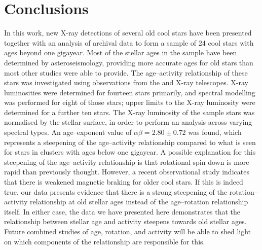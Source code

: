 \section{Conclusions}
In this work, new X-ray detections of several old cool stars have been presented together with an analysis of archival data to form a sample of 24 cool stars with ages beyond one gigayear. Most of the stellar ages in the sample have been determined by asteroseismology, providing more accurate ages for old stars than most other studies were able to provide. The age--activity relationship of these stars was investigated using observations from the \Chandra and \XMM X-ray telescopes. X-ray luminosities were determined for fourteen stars primarily, and spectral modelling was performed for eight of those stars; upper limits to the X-ray luminosity were determined for a further ten stars. The X-ray luminosity of the sample stars was normalised by the stellar surface, in order to  perform an analysis across varying spectral types. An age--exponent value of $\alpha\beta = 2.80 \pm 0.72$ was found, which represents a steepening of the age--activity relationship compared to what is seen for stars in clusters with ages below one gigayear. A possible explanation for this steepening of the age--activity relationship is that rotational spin down is more rapid than previously thought. However, a recent observational study \citep{van_Saders_etal_2016} indicates that there is weakened magnetic braking for older cool stars. If this is indeed true, our data presents evidence that there is a strong steepening of the rotation--activity relationship at old stellar ages instead of the age--rotation relationship itself. In either case, the data we have presented here demonstrates that the relationship between stellar age and activity steepens towards old stellar ages. Future combined studies of age, rotation, and activity will be able to shed light on which components of the relationship are responsible for this.

\newpage